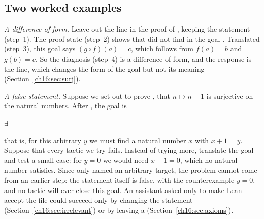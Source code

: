 \subsection*{Two worked examples}
\emph{A difference of form.} Leave out the line  in the proof of , keeping the statement (step~1). The proof state (step~2) shows that  did not find  in the goal . Translated (step~3), this goal says $(g\circ f)(a)=c$, which follows from $f(a)=b$ and $g(b)=c$. So the diagnosis (step~4) is a difference of form, and the response is the  line, which changes the form of the goal but not its meaning (Section~\ref{ch16:sec:surj}).

\emph{A false statement.} Suppose we set out to prove , that $n\mapsto n+1$ is surjective on the natural numbers. After , the goal is
\begin{center}
$\exists$\,
\end{center}
that is, for this arbitrary $y$ we must find a natural number $x$ with $x+1=y$. Suppose that every tactic we try fails. Instead of trying more, translate the goal and test a small case: for $y=0$ we would need $x+1=0$, which no natural number satisfies. Since  only named an arbitrary target, the problem cannot come from an earlier step: the statement itself is false, with the counterexample $y=0$, and no tactic will ever close this goal. An assistant asked only to make Lean accept the file could succeed only by changing the statement (Section~\ref{ch16:sec:irrelevant}) or by leaving a  (Section~\ref{ch16:sec:axioms}).

